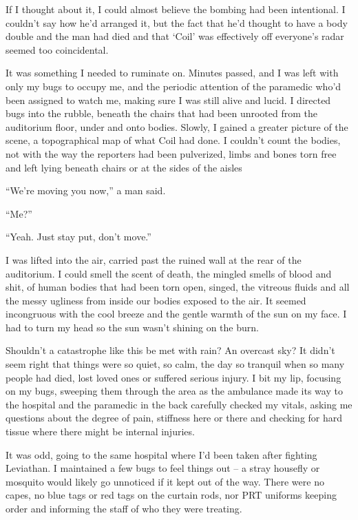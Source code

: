 If I thought about it, I could almost believe the bombing had been intentional.  I couldn't say how he'd arranged it, but the fact that he'd thought to have a body double and the man had died and that `Coil' was effectively off everyone's radar seemed too coincidental.



It was something I needed to ruminate on.  Minutes passed, and I was left with only my bugs to occupy me, and the periodic attention of the paramedic who'd been assigned to watch me, making sure I was still alive and lucid.  I directed bugs into the rubble, beneath the chairs that had been unrooted from the auditorium floor, under and onto bodies.  Slowly, I gained a greater picture of the scene, a topographical map of what Coil had done.  I couldn't count the bodies, not with the way the reporters had been pulverized, limbs and bones torn free and left lying beneath chairs or at the sides of the aisles



``We're moving you now,'' a man said.



``Me?''



``Yeah.  Just stay put, don't move.''



I was lifted into the air, carried past the ruined wall at the rear of the auditorium.  I could smell the scent of death, the mingled smells of blood and shit, of human bodies that had been torn open, singed, the vitreous fluids and all the messy ugliness from inside our bodies exposed to the air.  It seemed incongruous with the cool breeze and the gentle warmth of the sun on my face.  I had to turn my head so the sun wasn't shining on the burn.



Shouldn't a catastrophe like this be met with rain?  An overcast sky?  It didn't seem right that things were so quiet, so calm, the day so tranquil when so many people had died, lost loved ones or suffered serious injury.  I bit my lip, focusing on my bugs, sweeping them through the area as the ambulance made its way to the hospital and the paramedic in the back carefully checked my vitals, asking me questions about the degree of pain, stiffness here or there and checking for hard tissue where there might be internal injuries.



It was odd, going to the same hospital where I'd been taken after fighting Leviathan.  I maintained a few bugs to feel things out – a stray housefly or mosquito would likely go unnoticed if it kept out of the way.  There were no capes, no blue tags or red tags on the curtain rods, nor PRT uniforms keeping order and informing the staff of who they were treating.



